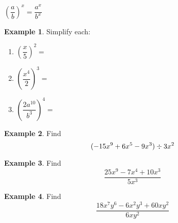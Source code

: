 \documentclass[addpoints,12pt]{exam}
\theoremstyle{definition}
\theoremstyle{break}
\theoremstyle{break}
\newtheorem{example}{Example}[subsection]
\begin{document}
\begin{definition}
$\left(\dfrac{a}{b}\right)^x = \dfrac{a^x}{b^x}$
\end{definition}
\vspace{.15in}

\begin{example}
Simplify each:
\begin{enumerate}
\item $\left(\dfrac{x}{5}\right)^2 = $
\vspace{.25in}
\item $\left(\dfrac{x^4}{2}\right)^3 = $
\vspace{.25in}
\item $\left(\dfrac{2a^{10}}{b^3}\right)^4 = $
\end{enumerate}
\end{example}

\newpage

\begin{example}
Find \[(-15x^9 + 6x^5 - 9x^3) \divisionsymbol 3x^2\]
\vspace{1.5in}
\end{example}

\begin{example}
Find \[\dfrac{25x^9 - 7x^4 + 10x^3}{5x^3}\]
\vspace{1.5in}
\end{example}

\begin{example}
Find \[\dfrac{18x^7y^6 - 6x^2y^3 + 60xy^2}{6xy^2}\]
\end{example}
\end{document}
